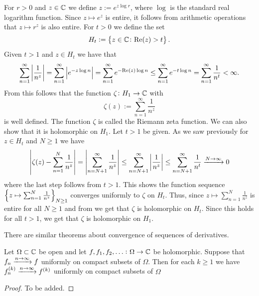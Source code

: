 \documentclass[11pt,a4paper]{article}
\begin{document}
\begin{example}
  For $r > 0$ and $z \in \mathbb{C}$ we define $z := e^{z \log r}$,
  where $\log$ is the standard real logarithm function.
  Since $z \mapsto e^z$ is entire,
  it follows from arithmetic operations that $z \mapsto r^z$ is also entire.
  For $t > 0$ we define the set
  \[
    H_t := \left\{z \in \mathbb{C} \colon \mathrm{Re}(z) > t\right\}.
  \]
  Given $t > 1$ and $z \in H_t$ we have that
  \[
    \sum_{n=1}^{\infty} \left\lvert\frac{1}{n^z}\right\rvert =
    \sum_{n=1}^{\infty} \left\lvert e^{-z \log n}\right\rvert =
    \sum_{n=1}^{\infty} e^{-\mathrm{Re}(z) \log n} \le
    \sum_{n=1}^{\infty} e^{-t \log n} =
    \sum_{n=1}^{\infty} \frac{1}{n^t} < \infty.
  \]
  From this follows that the function $\zeta \colon H_1 \to \mathbb{C}$ with
  \[
    \zeta(z) := \sum_{n=1}^{\infty} \frac{1}{n^z}
  \]
  is well defined.
  The function $\zeta$ is called the Riemann zeta function.
  We can also show that it is holomorphic on $H_1$.
  Let $t > 1$ be given.
  As we saw previously for $z \in H_t$ and $N \geq 1$ we have
  \[
    \left\lvert\zeta(z) - \sum_{n=1}^{N} \frac{1}{n^z}\right\rvert =
    \left\lvert\sum_{n=N+1}^{\infty} \frac{1}{n^z}\right\rvert \le
    \sum_{n=N+1}^{\infty} \left\lvert\frac{1}{n^z}\right\rvert \le
    \sum_{n=N+1}^{\infty} \frac{1}{n^t} \xrightarrow{N \to \infty} 0
  \]
  where the last step follows from $t > 1$.
  This shows the function sequence
  $\left\{z \mapsto \sum_{n=1}^{N} \frac{1}{n^z}\right\}_{N \geq 1}$
  converges uniformly to $\zeta$ on $H_t$.
  Thus, since $z \mapsto \sum_{n=1}^{N} \frac{1}{n^z}$ is entire for all
  $N \geq 1$ and from 
  we get that $\zeta$ is holomorphic on $H_t$.
  Since this holds for all $t > 1$,
  we get that $\zeta$ is holomorphic on $H_1$.
\end{example}

\begin{remark}
  There are similar theorems about convergence of sequences of derivatives.
\end{remark}

\begin{theorem}
  Let $\Omega \subset \mathbb{C}$ be open and let $f,f_1,f_2,\dots \colon \Omega \to \mathbb{C}$
  be holomorphic.
  Suppose that $f_n \xrightarrow{n \to \infty} f$ uniformly on compact subsets of
  $\Omega$.
  Then for each $k \geq 1$ we have $f^{(k)}_n \xrightarrow{n \to \infty} f^{(k)}$
  uniformly on compact subsets of $\Omega$
\end{theorem}
\begin{proof}
  To be added.
\end{proof}
\end{document}
